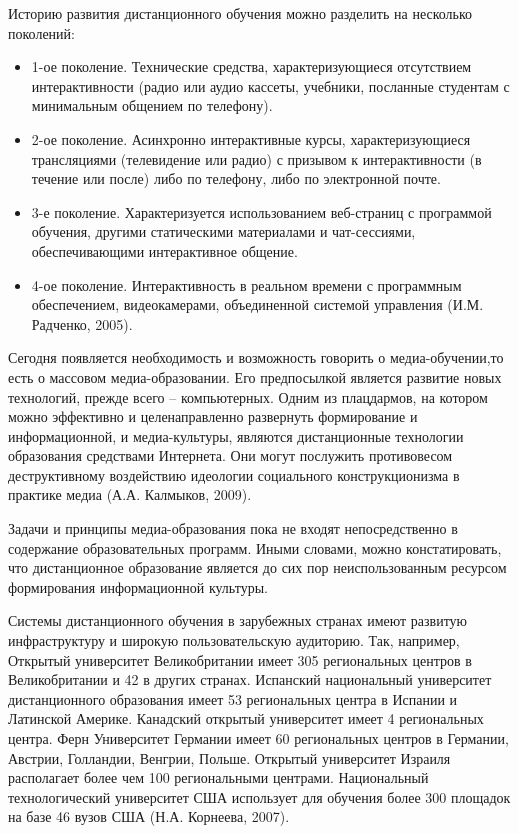 Историю развития дистанционного обучения можно разделить на несколько поколений:

\begin{itemize}
\item 1-ое поколение. Технические средства, характеризующиеся отсутствием интерактивности (радио или аудио кассеты, учебники, посланные студентам с минимальным общением по телефону).
\item 2-ое поколение. Асинхронно интерактивные курсы, характеризующиеся трансляциями (телевидение или радио) с призывом к интерактивности (в течение или после) либо по телефону, либо по электронной почте.
\item 3-е поколение. Характеризуется использованием веб-страниц с программой обучения, другими статическими материалами и чат-сессиями, обеспечивающими интерактивное общение.
\item 4-ое поколение. Интерактивность в реальном времени с программным обеспечением, видеокамерами, объединенной системой управления (И.М. Радченко, 2005).
\end{itemize}

Сегодня появляется необходимость и возможность говорить о медиа-обучении,то есть о массовом медиа-образовании. Его предпосылкой является развитие новых технологий, прежде всего – компьютерных. Одним из плацдармов, на котором можно эффективно и целенаправленно развернуть формирование и информационной, и медиа-культуры, являются дистанционные технологии образования средствами Интернета. Они могут послужить противовесом деструктивному воздействию идеологии социального конструкционизма в практике медиа (А.А. Калмыков, 2009).

Задачи и принципы медиа-образования пока не входят непосредственно в содержание образовательных программ. Иными словами, можно констатировать, что дистанционное образование является до сих пор неиспользованным ресурсом формирования информационной культуры. 

Системы дистанционного обучения в зарубежных странах имеют развитую инфраструктуру и широкую пользовательскую аудиторию. Так, например, Открытый университет Великобритании имеет 305 региональных центров в Великобритании и 42 в других странах. Испанский национальный университет дистанционного образования имеет 53 региональных центра в Испании и Латинской Америке. Канадский открытый университет имеет 4 региональных центра. Ферн Университет Германии имеет 60 региональных центров в Германии, Австрии, Голландии, Венгрии, Польше. Открытый университет Израиля располагает более чем 100 региональными центрами. Национальный технологический университет США использует для обучения более 300 площадок на базе 46 вузов США (Н.А. Корнеева, 2007). 

